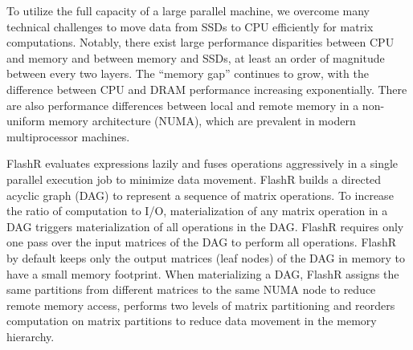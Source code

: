 

To utilize the full capacity of a large parallel machine, we overcome
many technical challenges to move data from SSDs to CPU efficiently for matrix
computations. Notably, there exist large performance disparities between CPU
and memory and between memory and SSDs, at least an order of magnitude between
every two layers. The ``memory gap'' \cite{Wilkes01} continues to grow, with
the difference between CPU and DRAM performance increasing exponentially.
There are also performance differences between
local and remote memory in a non-uniform memory architecture (NUMA), which are prevalent
in modern multiprocessor machines.

FlashR evaluates expressions lazily and fuses operations aggressively
in a single parallel execution job to minimize data movement. FlashR
builds a directed acyclic graph (DAG) to represent a sequence of matrix
operations. To increase the ratio of computation to I/O, materialization
of any matrix operation in a DAG triggers materialization of all operations
in the DAG. FlashR requires only one pass over the input matrices of
the DAG to perform all operations. FlashR by default keeps only the output
matrices (leaf nodes) of the DAG in memory to have a small memory footprint.
When materializing a DAG, FlashR assigns the same partitions from
different matrices to the same NUMA node
to reduce remote memory access, performs two levels of matrix partitioning
and reorders computation on matrix partitions to reduce data movement
in the memory hierarchy.

